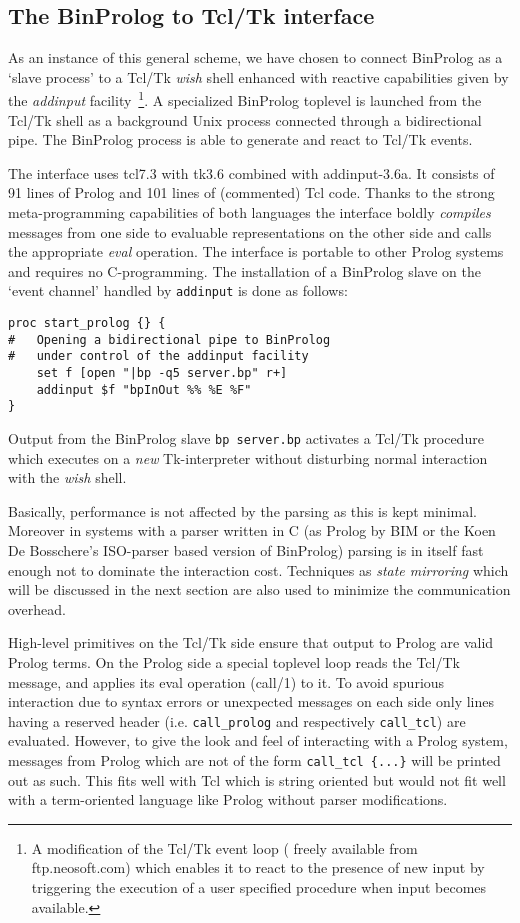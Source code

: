 \documentclass{article}
\begin{document}
\subsection{The BinProlog to Tcl/Tk interface}

As an instance of this general scheme,
we have chosen to connect BinProlog as a `slave process'
to a Tcl/Tk {\em wish} shell enhanced
with reactive capabilities
given by the {\em addinput} facility~\footnote{
A modification of the Tcl/Tk event loop (
freely available from
ftp.neosoft.com)
which enables it to react to the presence of new input
by triggering the execution of a user specified procedure
when input becomes available.}. A specialized BinProlog
toplevel is launched from the Tcl/Tk shell as a
background Unix process connected through
a bidirectional pipe.
The BinProlog process is able to generate and react to Tcl/Tk events.

The interface uses tcl7.3 with tk3.6 combined with addinput-3.6a.  It
consists of 91 lines
of Prolog and 101 lines of (commented) Tcl code.  Thanks to the
strong meta-programming capabilities of both languages the interface
boldly {\em compiles} 
messages from one side
to evaluable representations on the
other side and calls the appropriate
{\em eval} operation.
The interface is portable to other
Prolog systems and requires no C-programming. 
The installation of a BinProlog slave on the 
`event channel' handled by {\tt addinput} is done as follows:

{\small \begin{verbatim}
proc start_prolog {} {
#   Opening a bidirectional pipe to BinProlog
#   under control of the addinput facility
    set f [open "|bp -q5 server.bp" r+]
    addinput $f "bpInOut %% %E %F"
}
\end{verbatim}}

{\flushleft Output} from the BinProlog slave
{\tt bp server.bp} activates a Tcl/Tk
procedure which executes on a {\em new} Tk-interpreter without
disturbing normal interaction with the {\em wish} shell.

Basically, performance is not affected by the parsing
as this is kept minimal. Moreover in systems with a parser
written in C
(as Prolog by BIM or the Koen De Bosschere's 
ISO-parser based version of BinProlog)
parsing is in itself fast enough not to dominate
the interaction cost.
Techniques as {\em state mirroring} which will be discussed in the next
section are also used to minimize the communication overhead.

High-level primitives on the Tcl/Tk side ensure that
output to Prolog are valid Prolog terms.
On the Prolog side a special toplevel loop reads the
Tcl/Tk message, and applies its eval operation
(call/1) to it. To avoid spurious interaction due
to syntax errors or unexpected messages on each side
only lines having a reserved header (i.e. 
\verb~call_prolog~
and respectively \verb~call_tcl~)
are evaluated. However, to give the look and feel of interacting
with a Prolog system, messages from Prolog which are not
of the form \verb~call_tcl {...}~ will be printed out
as such. This fits well with Tcl which is string oriented
but would not fit well with a term-oriented language like
Prolog without parser modifications.
\end{document}
